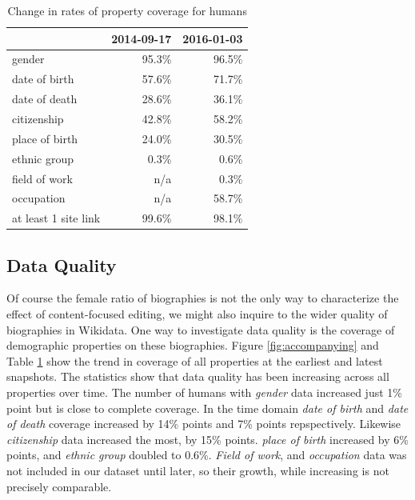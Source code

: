 \documentclass{sig-alternate-05-2015}
\begin{document}
\begin{table}
\caption{Change in rates of property coverage for humans}
\begin{tabular}{lrr}
\toprule
{} &  2014-09-17 &  2016-01-03 \\
\midrule
gender               &       95.3\% &       96.5\% \\
date of birth        &       57.6\% &       71.7\% \\
date of death        &       28.6\% &       36.1\% \\
citizenship          &       42.8\% &       58.2\% \\
place of birth       &       24.0\% &       30.5\% \\
ethnic group         &        0.3\% &        0.6\% \\
field of work        &        n/a &        0.3\% \\
occupation           &        n/a &       58.7\% \\
at least 1 site link &       99.6\% &       98.1\% \\
\bottomrule
\end{tabular}
\label{table:accompanying}
\end{table}

\subsection{Data Quality}
Of course the female ratio of biographies is not the only way to characterize the effect of content-focused editing, we might also inquire to the wider quality of biographies in Wikidata. One way to investigate data quality is the coverage of demographic  properties on these biographies. Figure \ref{fig:accompanying} and Table \ref{table:accompanying} show the trend in coverage of all properties at the earliest and latest snapshots. The statistics show that data quality has been increasing across all properties over time. The number of humans with \textit{gender} data increased just 1\% point but is close to complete coverage. In the time domain \textit{date of birth} and \textit{date of death} coverage increased by 14\% points and 7\% points repspectively. Likewise \textit{citizenship} data increased the most, by 15\% points. \textit{place of birth} increased by 6\% points, and \textit{ethnic group} doubled to 0.6\%. \textit{Field of work}, and \textit{occupation} data was not included in our dataset until later, so their growth, while increasing is not precisely comparable.
\end{document}
